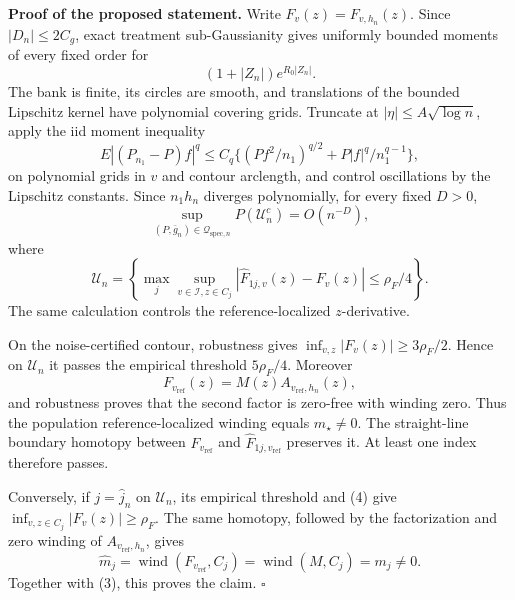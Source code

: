 \textbf{Proof of the proposed statement.}
Write \(F_v(z)=F_{v,h_n}(z)\). Since \(|D_n|\le2C_g\), exact treatment sub-Gaussianity gives uniformly bounded moments of every fixed order for
\[
 (1+|Z_n|)e^{R_0|Z_n|}. \tag{1}
\]
The bank is finite, its circles are smooth, and translations of the bounded Lipschitz kernel have polynomial covering grids. Truncate at \(|\eta|\le A\sqrt{\log n}\), apply the iid moment inequality
\[
 E|(P_{n_1}-P)f|^q
 \le C_q\{(Pf^2/n_1)^{q/2}+P|f|^q/n_1^{q-1}\}, \tag{2}
\]
on polynomial grids in \(v\) and contour arclength, and control oscillations by the Lipschitz constants. Since \(n_1h_n\) diverges polynomially, for every fixed \(D>0\),
\[
 \sup_{(P,\bar g_n)\in\mathcal Q_{\mathrm{spec},n}}P(\mathcal U_n^c)=O(n^{-D}), \tag{3}
\]
where
\[
 \mathcal U_n=\left\{\max_j\sup_{v\in\mathcal I,z\in C_j}
 |\widehat F_{1j,v}(z)-F_v(z)|\le\rho_F/4\right\}. \tag{4}
\]
The same calculation controls the reference-localized \(z\)-derivative.

On the noise-certified contour, robustness gives \(\inf_{v,z}|F_v(z)|\ge3\rho_F/2\). Hence on \(\mathcal U_n\) it passes the empirical threshold \(5\rho_F/4\). Moreover
\[
 F_{v_{\mathrm{ref}}}(z)=M(z)A_{v_{\mathrm{ref}},h_n}(z),
\]
and robustness proves that the second factor is zero-free with winding zero. Thus the population reference-localized winding equals \(m_\star\ne0\). The straight-line boundary homotopy between \(F_{v_{\mathrm{ref}}}\) and \(\widehat F_{1j,v_{\mathrm{ref}}}\) preserves it. At least one index therefore passes.

Conversely, if \(j=\widehat j_n\) on \(\mathcal U_n\), its empirical threshold and (4) give \(\inf_{v,z\in C_j}|F_v(z)|\ge\rho_F\). The same homotopy, followed by the factorization and zero winding of \(A_{v_{\mathrm{ref}},h_n}\), gives
\[
 \widehat m_j=\operatorname{wind}(F_{v_{\mathrm{ref}}},C_j)
 =\operatorname{wind}(M,C_j)=m_j\ne0. \tag{5}
\]
Together with (3), this proves the claim. \(\square\)